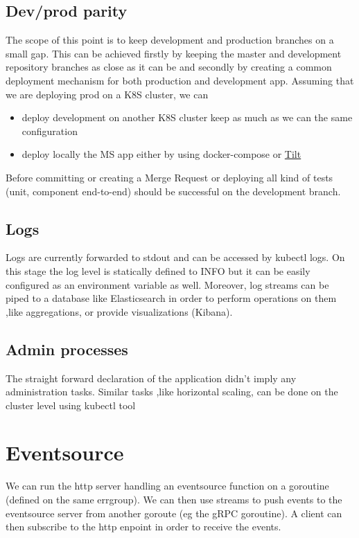 \documentclass[a4paper,10pt]{article}
\begin{document}
\subsection{Dev/prod parity}
The scope of this point is to keep development and production branches on a small gap. 
This can be achieved firstly by keeping the master and development repository branches as
close as it can be and secondly by creating a common deployment mechanism for both production and development app. Assuming that we are deploying prod on a K8S cluster, we can 
\begin{itemize}
    \item deploy development on another K8S cluster keep as much as we can the same configuration
    \item deploy locally the MS app either by using docker-compose or \href{https://tilt.dev/}{Tilt}
\end{itemize}

Before committing or creating a Merge Request or deploying all kind of tests (unit, component end-to-end) should be successful on the development branch.

\subsection{Logs}
Logs are currently forwarded to stdout and can be accessed by kubectl logs. 
On this stage the log level is statically defined to INFO but it can be easily 
configured as an environment variable as well. 
Moreover, log streams can be piped to a database like Elasticsearch in order to perform 
operations on them ,like aggregations, or provide visualizations (Kibana).
\subsection{Admin processes}
The straight forward declaration of the application didn't imply any administration tasks.
Similar tasks ,like horizontal scaling, can be done on the cluster level using kubectl tool



\section{Eventsource}
We can run the http server handling an eventsource function  on a goroutine (defined on the same errgroup). We can then use streams to push events to 
the eventsource server from another goroute (eg the gRPC goroutine). A client can then subscribe to the http enpoint in order to receive the events.
\end{document}
